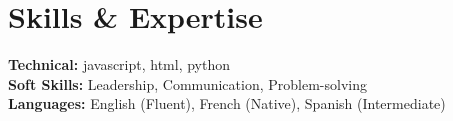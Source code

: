 \documentclass[11pt,a4paper]{article}
\begin{document}

\section{Skills \& Expertise}
\textcolor{primary}{\textbf{Technical:}} javascript, html, python\\
\textcolor{primary}{\textbf{Soft Skills:}} Leadership, Communication, Problem-solving\\
\textcolor{primary}{\textbf{Languages:}} English (Fluent), French (Native), Spanish (Intermediate)\\


\end{document}
